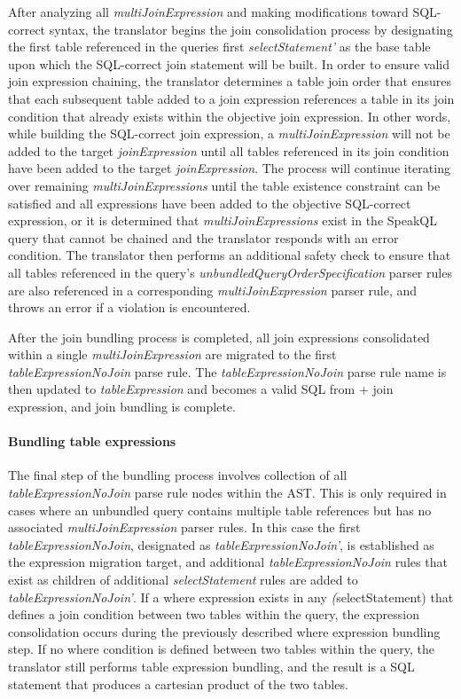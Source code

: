 After analyzing all \emph{multiJoinExpression} and making modifications toward SQL-correct syntax, the translator begins the join consolidation process by designating the first table referenced in the queries first \emph{selectStatement'} as the base table upon which the SQL-correct join statement will be built. In order to ensure valid join expression chaining, the translator determines a table join order that ensures that each subsequent table added to a join expression references a table in its join condition that already exists within the objective join expression. In other words, while building the SQL-correct join expression, a \emph{multiJoinExpression} will not be added to the target \emph{joinExpression} until all tables referenced in its join condition have been added to the target \emph{joinExpression}. The process will continue iterating over remaining \emph{multiJoinExpressions} until the table existence constraint can be satisfied and all expressions have been added to the objective SQL-correct expression, or it is determined that \emph{multiJoinExpressions} exist in the SpeakQL query that cannot be chained and the translator responds with an error condition. The translator then performs an additional safety check to ensure that all tables referenced in the query's \emph{unbundledQueryOrderSpecification} parser rules are also referenced in a corresponding \emph{multiJoinExpression} parser rule, and throws an error if a violation is encountered.

After the join bundling process is completed, all join expressions consolidated within a single \emph{multiJoinExpression} are migrated to the first \emph{tableExpressionNoJoin} parse rule. The \emph{tableExpressionNoJoin} parse rule name is then updated to \emph{tableExpression} and becomes a valid SQL from + join expression, and join bundling is complete.

\paragraph{Bundling table expressions}

The final step of the bundling process involves collection of all \emph{tableExpressionNoJoin} parse rule nodes within the AST. This is only required in cases where an unbundled query contains multiple table references but has no associated \emph{multiJoinExpression} parser rules. In this case the first \emph{tableExpressionNoJoin}, designated as \emph{tableExpressionNoJoin'}, is established as the expression migration target, and additional \emph{tableExpressionNoJoin} rules that exist as children of additional \emph{selectStatement} rules are added to \emph{tableExpressionNoJoin'}. If a where expression exists in any \emph(selectStatement) that defines a join condition between two tables within the query, the expression consolidation occurs during the previously described where expression bundling step. If no where condition is defined between two tables within the query, the translator still performs table expression bundling, and the result is a SQL statement that produces a cartesian product of the two tables.


